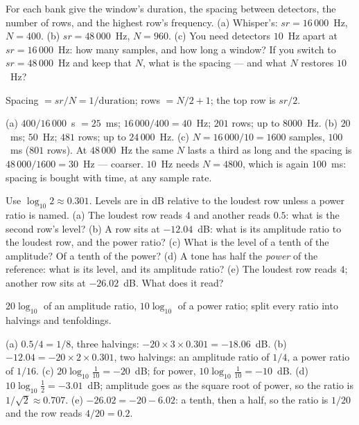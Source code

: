 \begin{problem}
For each bank give the window's duration, the spacing between
detectors, the number of rows, and the highest row's frequency. (a)
Whisper's: $sr = 16\,000$~Hz, $N = 400$. (b) $sr = 48\,000$~Hz, $N =
960$. (c) You need detectors $10$~Hz apart at $sr = 16\,000$~Hz: how
many samples, and how long a window? If you switch to $sr =
48\,000$~Hz and keep that $N$, what is the spacing — and what $N$
restores $10$~Hz?
\begin{hint}
Spacing $= sr/N = 1/\text{duration}$; rows $= N/2 + 1$; the top row is
$sr/2$.
\end{hint}
\begin{solution}
(a) $400/16\,000$~s $= 25$~ms; $16\,000/400 = 40$~Hz; $201$ rows; up to
$8000$~Hz. (b) $20$~ms; $50$~Hz; $481$ rows; up to $24\,000$~Hz. (c)
$N = 16\,000/10 = 1600$ samples, $100$~ms ($801$ rows). At $48\,000$~Hz
the same $N$ lasts a third as long and the spacing is $48\,000/1600 =
30$~Hz — coarser. $10$~Hz needs $N = 4800$, which is again $100$~ms:
spacing is bought with time, at any sample rate.
\end{solution}
\end{problem}

\begin{problem}
Use $\log_{10} 2 \approx 0.301$. Levels are in dB relative to the
loudest row unless a power ratio is named. (a) The loudest row reads
$4$ and another reads $0.5$: what is the second row's level? (b) A row
sits at $-12.04$~dB: what is its amplitude ratio to the loudest row,
and the power ratio? (c) What is the level of a tenth of the amplitude?
Of a tenth of the power? (d) A tone has half the \emph{power} of the
reference: what is its level, and its amplitude ratio? (e) The loudest
row reads $4$; another row sits at $-26.02$~dB. What does it read?
\begin{hint}
$20 \log_{10}$ of an amplitude ratio, $10 \log_{10}$ of a power ratio;
split every ratio into halvings and tenfoldings.
\end{hint}
\begin{solution}
(a) $0.5/4 = 1/8$, three halvings: $-20 \times 3 \times 0.301 =
-18.06$~dB. (b) $-12.04 = -20 \times 2 \times 0.301$, two halvings: an
amplitude ratio of $1/4$, a power ratio of $1/16$. (c) $20 \log_{10}
\tfrac{1}{10} = -20$~dB; for power, $10 \log_{10} \tfrac{1}{10} =
-10$~dB. (d) $10 \log_{10} \tfrac12 = -3.01$~dB; amplitude goes as the
square root of power, so the ratio is $1/\sqrt2 \approx 0.707$. (e)
$-26.02 = -20 - 6.02$: a tenth, then a half, so the ratio is $1/20$ and
the row reads $4/20 = 0.2$.
\end{solution}
\end{problem}

